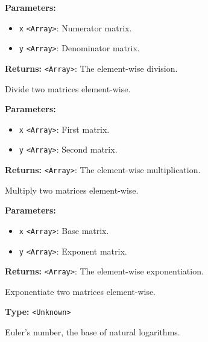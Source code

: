 \documentclass[12pt,a4paper]{article}
\begin{document}
\noindent \textbf{Parameters:}
\begin{itemize}
  \item \texttt{x} \texttt{<Array>}: Numerator matrix.
  \item \texttt{y} \texttt{<Array>}: Denominator matrix.
\end{itemize}

\noindent \textbf{Returns:} \texttt{<Array>}: The element-wise division.

\noindent Divide two matrices element-wise.

\vspace{5mm}
\noindent {}


\noindent \textbf{Parameters:}
\begin{itemize}
  \item \texttt{x} \texttt{<Array>}: First matrix.
  \item \texttt{y} \texttt{<Array>}: Second matrix.
\end{itemize}

\noindent \textbf{Returns:} \texttt{<Array>}: The element-wise multiplication.

\noindent Multiply two matrices element-wise.

\vspace{5mm}
\noindent {}


\noindent \textbf{Parameters:}
\begin{itemize}
  \item \texttt{x} \texttt{<Array>}: Base matrix.
  \item \texttt{y} \texttt{<Array>}: Exponent matrix.
\end{itemize}

\noindent \textbf{Returns:} \texttt{<Array>}: The element-wise exponentiation.

\noindent Exponentiate two matrices element-wise.

\vspace{5mm}
\noindent {}\vspace{4mm}


\noindent \textbf{Type:} \texttt{<Unknown>}

\noindent Euler's number, the base of natural logarithms.
\end{document}
